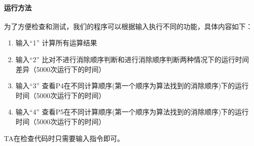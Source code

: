 \documentclass[a4paper, 11pt]{article}
\begin{document}
\begin{enumerate}
\paragraph{运行方法}
为了方便检查和测试，我们的程序可以根据输入执行不同的功能，具体内容如下：
\begin{enumerate}
\item 输入“1” \qquad  计算所有运算结果
\item 输入“2” \qquad 比对不进行消除顺序判断和进行消除顺序判断两种情况下的运行时间差异（5000次运行下的时间）
\item 输入“3” \qquad 查看P4在不同计算顺序(第一个顺序为算法找到的消除顺序)下的运行时间（5000次运行下的时间）
\item 输入“4” \qquad 查看P5在不同计算顺序(第一个顺序为算法找到的消除顺序)下的运行时间（5000次运行下的时间）
\end{enumerate}
TA在检查代码时只需要输入指令即可。


\end{enumerate}
\end{document}
